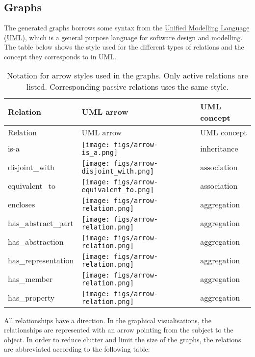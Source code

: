 \documentclass[a4paper,]{report}
\begin{document}
\hypertarget{graphs}{%
\subsection{Graphs}\label{graphs}}

The generated graphs borrows some syntax from the
\href{http://www.uml.org/}{Unified Modelling Language (UML)}, which is a
general purpose language for software design and modelling. The table
below shows the style used for the different types of relations and the
concept they corresponds to in UML.

\begin{longtable}[]{@{}lll@{}}
\caption{Notation for arrow styles used in the graphs. Only active
relations are listed. Corresponding passive relations uses the same
style.}\tabularnewline
\toprule
Relation & UML arrow & UML concept\tabularnewline
\midrule
\endfirsthead
\toprule
Relation & UML arrow & UML concept\tabularnewline
\midrule
\endhead
is-a & \texttt{[image: figs/arrow-is\_a.png]} &
inheritance\tabularnewline
disjoint\_with & \texttt{[image: figs/arrow-disjoint\_with.png]} &
association\tabularnewline
equivalent\_to & \texttt{[image: figs/arrow-equivalent\_to.png]} &
association\tabularnewline
encloses & \texttt{[image: figs/arrow-relation.png]} &
aggregation\tabularnewline
has\_abstract\_part & \texttt{[image: figs/arrow-relation.png]} &
aggregation\tabularnewline
has\_abstraction & \texttt{[image: figs/arrow-relation.png]} &
aggregation\tabularnewline
has\_representation & \texttt{[image: figs/arrow-relation.png]} &
aggregation\tabularnewline
has\_member & \texttt{[image: figs/arrow-relation.png]} &
aggregation\tabularnewline
has\_property & \texttt{[image: figs/arrow-relation.png]} &
aggregation\tabularnewline
\bottomrule
\end{longtable}

All relationships have a direction. In the graphical visualisations, the
relationships are represented with an arrow pointing from the subject to
the object. In order to reduce clutter and limit the size of the graphs,
the relations are abbreviated according to the following table:
\end{document}
